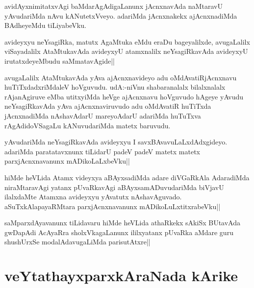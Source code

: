 \begin{artha}
avidAyxnimitatxvAgi baMdarAgAdigaLanunx jAcnxnavAda naMtaravU yAvudariMda nAvu kANutetxVveyo. adariMda jAcnxnakekx ajAcnxnadiMda BAdheyeMdu tiLiyabeVku.
\end{artha}

\begin{artha}
avideyxyu neYsagiRka, matutx AgaMtuka eMdu eraDu bageyalilxde, avugaLalilx viSayadalilx AtaMtukavAda avideyxyU atamxnalilx neYsagiRkavAda avideyxyU irutatxdeyeMbudu saMmatavAgide||
\end{artha}


\begin{artha}
avugaLalilx AtaMtukavAda yAva ajAcnxnavideyo adu oMdAvatiRjAcnxnavu huTiTxdadxriMdaleV hoVguvudu. udA:-niVnu shabaranalalx bilalxnalalx rAjanAgiruve eMba utitxyiMda heVge ajAcnxnavu hoVguvudo hAgeye yAvudu neYsagiRkavAda yAva ajAcnxnaviruvudo adu oMdAvatiR huTiTxda jAcnxnadiMda nAshavAdarU mareyoAdarU adariMda huTuTxva rAgAdidoVSagaLu kANuvudariMda matetx baruvudu.
\end{artha}


\begin{artha}
yAvudariMda neYsagiRkavAda avideyxyu I savxBAvavuLaLxdAdxgideyo. adariMda paratatavxnunx tiLidarU padeV padeV matetx matetx parxjAcnxnavanunx mADikoLaLxbeVku||
\end{artha}


\begin{artha}
hiMde heVLida Atamx videyxya aBAyxsadiMda adare diVGaRkAla AdaradiMda niraMtaravAgi yatanx pUvaRkavAgi aBAyxsamADuvudariMda biVjavU ilalxdaMte Atamxna avideyxyu yAvatutx nAshavAguvado. aSuTxkAlapayaRMtara parxjAcnxnavanunx mADikoLuLxtitxrabeVku||
\end{artha}

\begin{artha}
saMparxdAyavanunx tiLidavaru hiMde heVLida athaRkekx sAkiSx BUtavAda gwDapAdi AcAyaRra sholxVkagaLanunx ililxyatanx pUvaRka aMdare guru shushUrxSe modalAdavugaLiMda parisutAtxre||
\end{artha}

\section*{veYtathayxparxkAraNada kArike}

